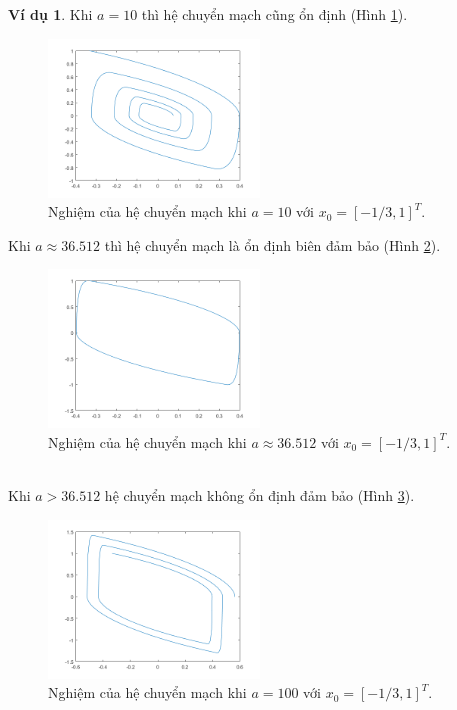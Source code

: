 \documentclass[14pt,a4paper,oneside]{report}		%
\theoremstyle{definition}
\newtheorem{example}[theorem]{Ví dụ}
\begin{document}
\begin{example}
Khi $a=10$ thì hệ chuyển mạch cũng ổn định (Hình \ref{fig:11}).
\begin{figure}[h]
\centering
\includegraphics[width=0.5\textwidth]{graph5.png}
\caption{Nghiệm của hệ chuyển mạch khi $a=10$ với $x_0=[-1/3,1]^T$.}\label{fig:11}
\end{figure}
\newpage
Khi $a\approx 36.512$ thì hệ chuyển mạch là ổn định biên đảm bảo (Hình \ref{fig:6}).
\begin{figure}[h]
\centering
\includegraphics[width=0.5\textwidth]{graph4.png}
\caption{Nghiệm của hệ chuyển mạch khi $a\approx 36.512$ với $x_0=[-1/3,1]^T$.}\label{fig:6}
\end{figure}\\

Khi $a>36.512$ hệ chuyển mạch không ổn định đảm bảo (Hình \ref{fig:7}).
\newpage
\begin{figure}[h]
\centering
\includegraphics[width=0.5\textwidth]{graph6.png}
\caption{Nghiệm của hệ chuyển mạch khi $a=100$ với $x_0=[-1/3,1]^T$.}\label{fig:7}
\end{figure}
\end{example}
\end{document}
